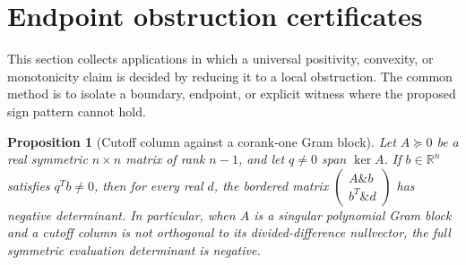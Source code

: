 \documentclass[11pt]{article}
\numberwithin{equation}{section}
\newtheorem{proposition}[theorem]{Proposition}
\theoremstyle{definition}
\theoremstyle{remark}
\newcommand{\1}{\mathbf 1}
\begin{document}
\section{Endpoint obstruction certificates}
\label{sec:endpoint-obstruction-certificates}
This section collects applications in which a universal positivity, convexity, or monotonicity claim is decided by reducing it to a local obstruction.  The common method is to isolate a boundary, endpoint, or explicit witness where the proposed sign pattern cannot hold.

\begin{proposition}[Cutoff column against a corank-one Gram block]
\label{res:cutoff-column-against-corankone-gram}
Let \(A\succeq0\) be a real symmetric \(n\times n\) matrix of rank \(n-1\), and let \(q\ne0\) span \(\ker A\). If \(b\in\mathbb R^n\) satisfies \(q^Tb\ne0\), then for every real \(d\), the bordered matrix \(\begin{pmatrix}A\&b\\ b^T\&d\end{pmatrix}\) has negative determinant. In particular, when \(A\) is a singular polynomial Gram block and a cutoff column is not orthogonal to its divided-difference nullvector, the full symmetric evaluation determinant is negative.
\end{proposition}
\end{document}
